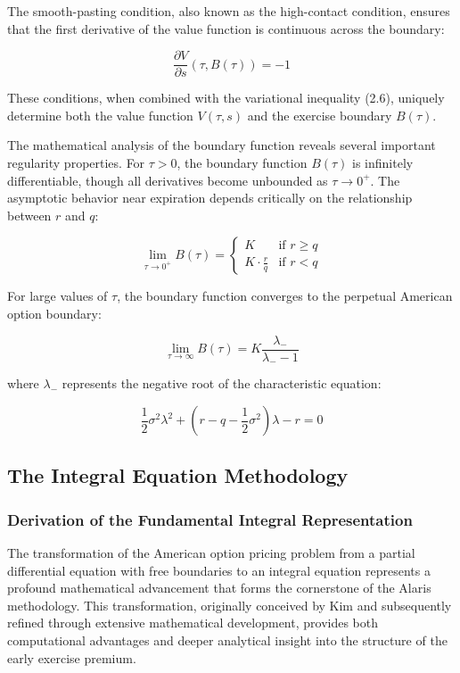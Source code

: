 \documentclass[
  11pt,
  11pt,
  letterpaper,
  onecolumn]{article}
\begin{document}
The smooth-pasting condition, also known as the high-contact condition,
ensures that the first derivative of the value function is continuous
across the boundary:

\[\frac{\partial V}{\partial s}(\tau, B(\tau)) = -1 \tag{2.10}\]

These conditions, when combined with the variational inequality (2.6),
uniquely determine both the value function \(V(\tau,s)\) and the
exercise boundary \(B(\tau)\).

The mathematical analysis of the boundary function reveals several
important regularity properties. For \(\tau > 0\), the boundary function
\(B(\tau)\) is infinitely differentiable, though all derivatives become
unbounded as \(\tau \to 0^+\). The asymptotic behavior near expiration
depends critically on the relationship between \(r\) and \(q\):

\[\lim_{\tau \to 0^+} B(\tau) = \begin{cases}
K & \text{if } r \geq q \\
K \cdot \frac{r}{q} & \text{if } r < q
\end{cases} \tag{2.11}\]

For large values of \(\tau\), the boundary function converges to the
perpetual American option boundary:

\[\lim_{\tau \to \infty} B(\tau) = K \frac{\lambda_-}{\lambda_- - 1} \tag{2.12}\]

where \(\lambda_-\) represents the negative root of the characteristic
equation:

\[\frac{1}{2}\sigma^2 \lambda^2 + \left(r-q-\frac{1}{2}\sigma^2\right)\lambda - r = 0 \tag{2.13}\]

\subsection{The Integral Equation
Methodology}\label{the-integral-equation-methodology}

\subsubsection{Derivation of the Fundamental Integral
Representation}\label{derivation-of-the-fundamental-integral-representation}

The transformation of the American option pricing problem from a partial
differential equation with free boundaries to an integral equation
represents a profound mathematical advancement that forms the
cornerstone of the Alaris methodology. This transformation, originally
conceived by Kim and subsequently refined through extensive mathematical
development, provides both computational advantages and deeper
analytical insight into the structure of the early exercise premium.
\end{document}

